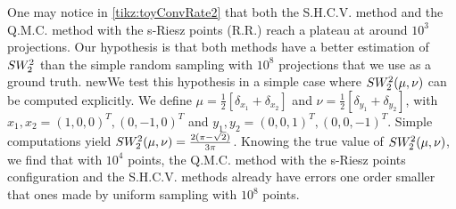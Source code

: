 \begin{Rk}
One may notice in \autoref{tikz:toyConvRate2} that both the 
{S.H.C.V.}
method and the Q.M.C. method with the s-Riesz points {(R.R.)} reach a 
plateau at around $10^3$ projections. Our hypothesis is that both methods have a 
better estimation of $SW_2^2$ than the simple random sampling with {$10^8$} 
projections that we use as a ground truth. new{We test this hypothesis in a simple case where 
$SW_2^2(\mu,\nu)$ can be computed explicitly. We define $\mu = 
\frac{1}{2}[\delta_{x_1} + \delta_{x_2}]$  and $\nu = \frac{1}{2}[\delta_{y_1} + 
\delta_{y_2}]$, with $ x_1,x_2 = (1,0,0)^T, (0,-1,0)^T$ and $y_1,y_2 = 
(0,0,1)^T,(0,0,-1)^T$.
Simple computations yield $SW_2^2(\mu,\nu) = \frac{2(\pi - 
\sqrt{2})}{3\pi}$. Knowing the true value of $SW_2^2(\mu,\nu)$, we find that with 
$10^4$ points, {the Q.M.C. method with the s-Riesz points configuration and 
the S.H.C.V. methods already have errors one order smaller that ones made by uniform sampling with $10^8$ points.}}
\end{Rk}

